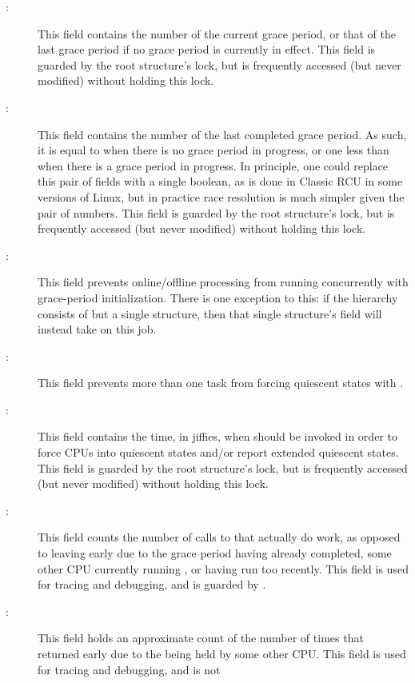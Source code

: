 \begin{description}
\item[:]
	This field contains the number of the current grace period,
	or that of the last grace period if no grace period is currently
	in effect.
	This field is guarded by the root  structure's lock,
	but is frequently accessed (but never modified) without holding
	this lock.
\item[:]
	This field contains the number of the last completed grace period.
	As such, it is equal to  when there is no grace period
	in progress, or one less than  when there is a
	grace period in progress.
	In principle, one could replace this pair of fields with a single
	boolean, as is done in Classic RCU in some versions of Linux,
	but in practice race resolution is much simpler given the pair
	of numbers.
	This field is guarded by the root  structure's lock,
	but is frequently accessed (but never modified) without holding
	this lock.
\item[:]
	This field prevents online/offline processing from running
	concurrently with grace-period initialization.
	There is one exception to this: if the 
	hierarchy consists of but a single structure, then
	that single structure's  field will instead take on
	this job.
\item[:]
	This field prevents more than one task from forcing quiescent
	states with .
\item[:]
	This field contains the time, in jiffies, when
	 should be invoked in order to
	force CPUs into quiescent states and/or report extended
	quiescent states.
	This field is guarded by the root  structure's lock,
	but is frequently accessed (but never modified) without holding
	this lock.
\item[:]
	This field counts the number of calls to 
	that actually do work, as opposed to leaving early due to
	the grace period having already completed, some other
	CPU currently running ,
	or  having run too recently.
	This field is used for tracing and debugging, and
	is guarded by .
\item[:]
	This field holds an approximate count of the number of times that
	 returned early due to the
	 being held by some other CPU.
	This field is used for tracing and debugging, and is not

\end{description}
